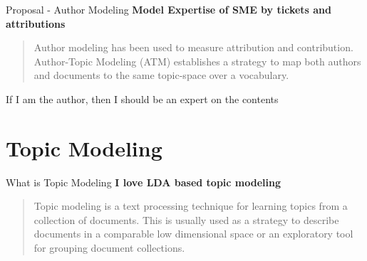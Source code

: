 \documentclass[10pt]{beamer}
\begin{document}
\begin{frame}{Proposal - Author Modeling}
  {\bf Model Expertise of SME by tickets and attributions}

  \begin{quote}
    Author modeling
    has been used to measure attribution\cite{Rexha2018} and
  contribution\cite{AldebeiHJ016}. Author-Topic Modeling (ATM) establishes a strategy to
  map both authors and documents to the same topic-space over a vocabulary\cite{Rosen-Zvi2004}.
  \end{quote}

  \begin{center}
    If I am the author, then I should be an expert on the contents
  \end{center}
\end{frame}

\section{Topic Modeling}

\begin{frame}{What is Topic Modeling}
  {\bf I love LDA based topic modeling}

  \begin{quote}
    Topic modeling\cite{Ren2013} is a text processing technique for learning topics from a collection of documents. This is usually used as a strategy to describe documents in a comparable low dimensional space or an exploratory tool for grouping document collections.
  \end{quote}
\end{frame}

\newcommand{\Food}[1]{\colorbox{orange!30}{#1}\xspace}
\newcommand{\Travel}[1]{\colorbox{blue!30}{#1}\xspace}
\newcommand{\Time}[1]{\colorbox{green!30}{#1}\xspace}
\newcommand{\Document}[1]{\fbox{\begin{minipage}{\columnwidth}#1\end{minipage}}}
\end{document}
